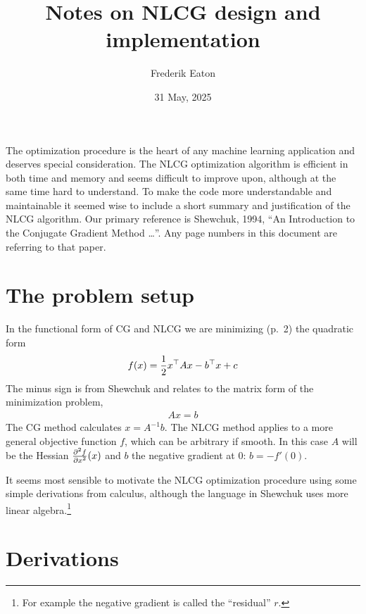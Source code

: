 \documentclass[11pt]{article}
\author{Frederik Eaton}
\date{31 May, 2025}
\title{Notes on NLCG design and implementation}
\newcommand{\T}{\top}
\renewcommand{\(}{\left(}
\renewcommand{\)}{\right)}
\newcommand{\partbyt}[2]{{\partial^2 #1\over {\partial #2}^2}}
\begin{document}
\maketitle

The optimization procedure is the heart of any machine learning
application and deserves special consideration. The NLCG optimization
algorithm is efficient in both time and memory and seems difficult to
improve upon, although at the same time hard to understand. To make
the code more understandable and maintainable it seemed wise to
include a short summary and justification of the NLCG algorithm. Our
primary reference is Shewchuk, 1994, ``An Introduction to the
Conjugate Gradient Method \ldots''. Any page numbers in this document
are referring to that paper.

\section{The problem setup}

In the functional form of CG and NLCG we are minimizing (p.~2) the
quadratic form
\begin{align}
f(x) = {1\over 2} x^\T A x - b^\T x + c
\end{align}
The minus sign is from Shewchuk and relates to the matrix form of the
minimization problem,
\begin{align}
Ax=b
\end{align}
The CG method calculates $x=A^{-1} b$. The NLCG method applies to a
more general objective function $f$, which can be arbitrary if smooth.
In this case $A$ will be the Hessian $\partbyt{f}{x}(x)$ and $b$ the
negative gradient at 0: $b=-f'(0)$.

It seems most sensible to motivate the NLCG optimization procedure
using some simple derivations from calculus, although the language in
Shewchuk uses more linear algebra.\footnote{For example the negative
gradient is called the ``residual'' $r$.}

\section{Derivations}

\newcommand{\deriv}[1]{\item{\bf #1}\nopagebreak}
\end{document}
